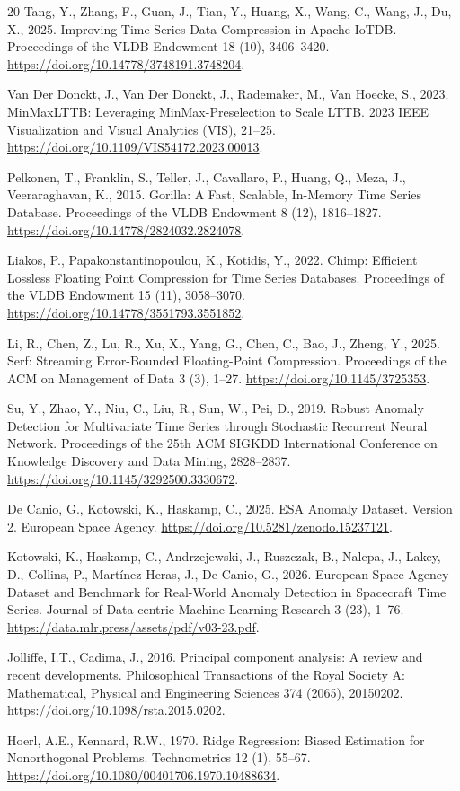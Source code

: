 \documentclass[a4paper,fleqn]{cas-dc}
\begin{document}
\begin{thebibliography}{20}
Tang, Y., Zhang, F., Guan, J., Tian, Y., Huang, X., Wang, C., Wang, J., Du, X., 2025. Improving Time Series Data Compression in Apache IoTDB. Proceedings of the VLDB Endowment 18 (10), 3406--3420. \url{https://doi.org/10.14778/3748191.3748204}.

Van Der Donckt, J., Van Der Donckt, J., Rademaker, M., Van Hoecke, S., 2023. MinMaxLTTB: Leveraging MinMax-Preselection to Scale LTTB. 2023 IEEE Visualization and Visual Analytics (VIS), 21--25. \url{https://doi.org/10.1109/VIS54172.2023.00013}.

Pelkonen, T., Franklin, S., Teller, J., Cavallaro, P., Huang, Q., Meza, J., Veeraraghavan, K., 2015. Gorilla: A Fast, Scalable, In-Memory Time Series Database. Proceedings of the VLDB Endowment 8 (12), 1816--1827. \url{https://doi.org/10.14778/2824032.2824078}.

Liakos, P., Papakonstantinopoulou, K., Kotidis, Y., 2022. Chimp: Efficient Lossless Floating Point Compression for Time Series Databases. Proceedings of the VLDB Endowment 15 (11), 3058--3070. \url{https://doi.org/10.14778/3551793.3551852}.

Li, R., Chen, Z., Lu, R., Xu, X., Yang, G., Chen, C., Bao, J., Zheng, Y., 2025. Serf: Streaming Error-Bounded Floating-Point Compression. Proceedings of the ACM on Management of Data 3 (3), 1--27. \url{https://doi.org/10.1145/3725353}.

Su, Y., Zhao, Y., Niu, C., Liu, R., Sun, W., Pei, D., 2019. Robust Anomaly Detection for Multivariate Time Series through Stochastic Recurrent Neural Network. Proceedings of the 25th ACM SIGKDD International Conference on Knowledge Discovery and Data Mining, 2828--2837. \url{https://doi.org/10.1145/3292500.3330672}.

De Canio, G., Kotowski, K., Haskamp, C., 2025. ESA Anomaly Dataset. Version 2. European Space Agency. \url{https://doi.org/10.5281/zenodo.15237121}.

Kotowski, K., Haskamp, C., Andrzejewski, J., Ruszczak, B., Nalepa, J., Lakey, D., Collins, P., Mart\'inez-Heras, J., De Canio, G., 2026. European Space Agency Dataset and Benchmark for Real-World Anomaly Detection in Spacecraft Time Series. Journal of Data-centric Machine Learning Research 3 (23), 1--76. \url{https://data.mlr.press/assets/pdf/v03-23.pdf}.

Jolliffe, I.T., Cadima, J., 2016. Principal component analysis: A review and recent developments. Philosophical Transactions of the Royal Society A: Mathematical, Physical and Engineering Sciences 374 (2065), 20150202. \url{https://doi.org/10.1098/rsta.2015.0202}.

Hoerl, A.E., Kennard, R.W., 1970. Ridge Regression: Biased Estimation for Nonorthogonal Problems. Technometrics 12 (1), 55--67. \url{https://doi.org/10.1080/00401706.1970.10488634}.

\end{thebibliography}

\printcredits
\end{document}
